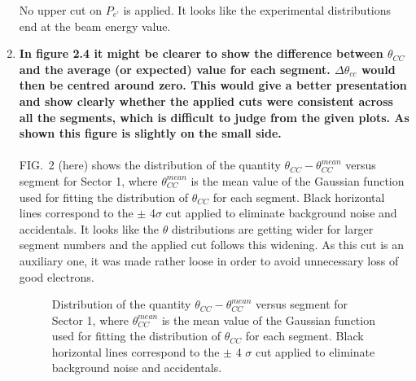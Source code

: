 \documentclass[,superscriptaddress,showpacs,amssymb,amsmath,amsfonts,linenumbers,article]{revtex4-1}
\begin{document}
\begin{enumerate}[label=\textbf{\arabic*}.]

No upper cut on $P_{e’}$ is applied. It looks like the experimental distributions end at the beam energy value. 


\item {\bf In figure 2.4 it might be clearer to show the difference between $\theta_{CC}$ and the average (or expected) value for each segment. $\Delta \theta_{cc}$ would then be centred around zero. This would give a better presentation and show clearly whether the applied cuts were consistent across all the segments, which is difficult to judge from the given plots. As shown this figure is slightly on the small side.}\\ \\
FIG.~2 (here) shows the distribution of the quantity $\theta_{CC} - \theta_{CC}^{mean}$ versus segment for Sector 1, where $\theta_{CC}^{mean}$ is the mean value of the Gaussian function used for fitting the distribution of $\theta_{CC}$ for each segment. Black horizontal lines correspond to the $\pm$ 4$\sigma$ cut applied to eliminate background noise and accidentals. It looks like the $\theta$ distributions are getting wider for larger segment numbers and the applied cut follows this widening. As this cut is an auxiliary one, it was made rather loose in order to avoid unnecessary loss of good electrons.
\begin{figure}[htp]
\begin{center}
\caption{\small Distribution of the quantity $\theta_{CC} - \theta_{CC}^{mean}$ versus segment for Sector 1, where $\theta_{CC}^{mean}$ is the mean value of the Gaussian function used for fitting the distribution of $\theta_{CC}$ for each segment. Black horizontal lines correspond to the $\pm$ 4 $\sigma$ cut applied to eliminate background noise and accidentals.}  \label{fig:cc_plane_def}
\end{center}
\end{figure}


\end{enumerate}
\end{document}
